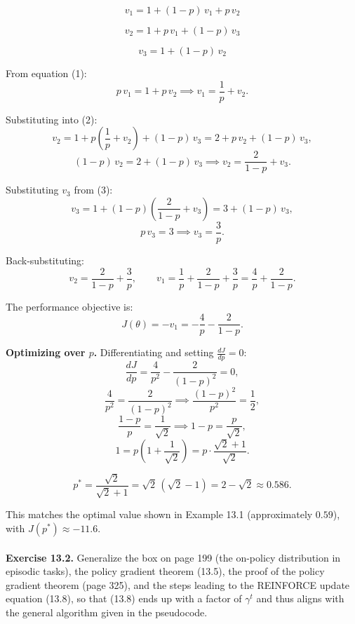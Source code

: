 \documentclass{article}
\begin{document}
\begin{equation}
  v_1 = 1 + (1-p)\,v_1 + p\,v_2
\end{equation}

\begin{equation}
  v_2 = 1 + p\,v_1 + (1-p)\,v_3
\end{equation}

\begin{equation}
  v_3 = 1 + (1-p)\,v_2
\end{equation}

From equation (1):
\[
  p\,v_1 = 1 + p\,v_2 \implies v_1 = \frac{1}{p} + v_2.
\]

Substituting into (2):
\[
  v_2 = 1 + p\!\left(\frac{1}{p} + v_2\right) + (1-p)\,v_3
       = 2 + p\,v_2 + (1-p)\,v_3,
\]
\[
  (1-p)\,v_2 = 2 + (1-p)\,v_3 \implies v_2 = \frac{2}{1-p} + v_3.
\]

Substituting $v_3$ from (3):
\[
  v_3 = 1 + (1-p)\!\left(\frac{2}{1-p} + v_3\right) = 3 + (1-p)\,v_3,
\]
\[
  p\,v_3 = 3 \implies v_3 = \frac{3}{p}.
\]

Back-substituting:
\[
  v_2 = \frac{2}{1-p} + \frac{3}{p}, \qquad
  v_1 = \frac{1}{p} + \frac{2}{1-p} + \frac{3}{p} = \frac{4}{p} + \frac{2}{1-p}.
\]

The performance objective is:
\[
  J(\theta) = -v_1 = -\frac{4}{p} - \frac{2}{1-p}.
\]

\bigskip

\textbf{Optimizing over $p$.} Differentiating and setting $\frac{dJ}{dp} = 0$:
\[
  \frac{dJ}{dp} = \frac{4}{p^2} - \frac{2}{(1-p)^2} = 0,
\]
\[
  \frac{4}{p^2} = \frac{2}{(1-p)^2} \implies \frac{(1-p)^2}{p^2} = \frac{1}{2},
\]
\[
  \frac{1-p}{p} = \frac{1}{\sqrt{2}} \implies 1 - p = \frac{p}{\sqrt{2}},
\]
\[
  1 = p\!\left(1 + \frac{1}{\sqrt{2}}\right) = p \cdot \frac{\sqrt{2}+1}{\sqrt{2}}.
\]

\[
  \boxed{p^* = \frac{\sqrt{2}}{\sqrt{2}+1} = \sqrt{2}\,(\sqrt{2}-1) = 2 - \sqrt{2} \approx 0.586.}
\]

This matches the optimal value shown in Example 13.1 (approximately $0.59$), with $J(p^*) \approx -11.6$.
\\\\
\textbf{Exercise 13.2.} Generalize the box on page 199 (the on-policy distribution in episodic
tasks), the policy gradient theorem (13.5), the proof of the policy gradient theorem (page 325),
and the steps leading to the REINFORCE update equation (13.8), so that (13.8) ends up with
a factor of $\gamma^t$ and thus aligns with the general algorithm given in the pseudocode.
\end{document}
